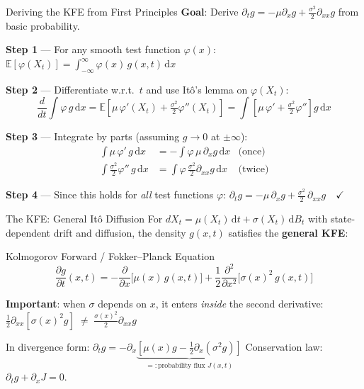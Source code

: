 \documentclass[aspectratio=169,11pt]{beamer}
\newcommand{\emphc}[1]{\textcolor{harvardcrimson}{#1}}
\newcommand{\E}[1]{\mathbb{E}\!\left[#1\right]}
\newcommand{\ud}{\,\mathrm{d}}
\begin{document}
\begin{frame}{Deriving the KFE from First Principles}
\small
\textbf{Goal}: Derive $\partial_t g = -\mu\partial_x g + \frac{\sigma^2}{2}\partial_{xx} g$ from basic probability.

\vspace{0.1em}
\textbf{Step 1} --- For any smooth test function $\varphi(x)$:
$\E{\varphi(X_t)} = \int_{-\infty}^{\infty} \varphi(x)\,g(x,t)\ud x$

\textbf{Step 2} --- Differentiate w.r.t.\ $t$ and use It\^o's lemma on $\varphi(X_t)$:
\[
\frac{d}{dt}\int \varphi\, g\ud x = \E{\mu\,\varphi'(X_t) + \tfrac{\sigma^2}{2}\varphi''(X_t)} = \int \left[\mu\,\varphi' + \tfrac{\sigma^2}{2}\varphi''\right] g\ud x
\]

\vspace{-0.3em}
\textbf{Step 3} --- Integrate by parts (assuming $g \to 0$ at $\pm\infty$):
\vspace{-0.3em}
\begin{align*}
\int \mu\,\varphi'\, g \ud x &= -\int \varphi\,\mu\,\partial_x g\ud x & \text{(once)}\\
\int \tfrac{\sigma^2}{2}\varphi''\, g\ud x &= \int \varphi\,\tfrac{\sigma^2}{2}\partial_{xx}g\ud x & \text{(twice)}
\end{align*}

\vspace{-0.3em}
\textbf{Step 4} --- Since this holds for \emph{all} test functions $\varphi$:
$\boxed{\partial_t g = -\mu\,\partial_x g + \tfrac{\sigma^2}{2}\,\partial_{xx} g} \quad \checkmark$
\end{frame}

\begin{frame}{The KFE: General It\^o Diffusion}
\small
For $dX_t = \mu(X_t)\ud t + \sigma(X_t)\ud B_t$ with \emphc{state-dependent} drift and diffusion,
the density $g(x,t)$ satisfies the \textbf{general KFE}:

\begin{block}{Kolmogorov Forward / Fokker--Planck Equation}
\vspace{-0.5em}
\[
\boxed{\frac{\partial g}{\partial t}(x,t) = -\frac{\partial}{\partial x}\big[\mu(x)\,g(x,t)\big] + \frac{1}{2}\frac{\partial^2}{\partial x^2}\big[\sigma(x)^2\,g(x,t)\big]}
\]
\vspace{-0.5em}
\end{block}

\textbf{Important}: when $\sigma$ depends on $x$, it enters \emph{inside} the second derivative:
$\frac{1}{2}\partial_{xx}\!\left[\sigma(x)^2 g\right] \;\neq\; \frac{\sigma(x)^2}{2}\partial_{xx}g$

In \emphc{divergence form}: $\partial_t g = -\partial_x\underbrace{\left[\mu(x)g - \frac{1}{2}\partial_x(\sigma^2 g)\right]}_{=:\text{probability flux } J(x,t)}$
\quad Conservation law: $\partial_t g + \partial_x J = 0$.
\end{frame}
\end{document}
